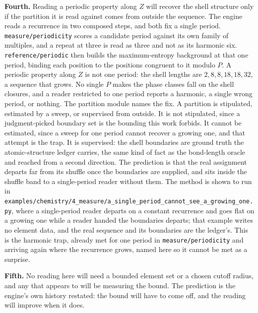 \textbf{Fourth.} Reading a periodic property along \(Z\) will recover the shell structure only if the
partition it is read against comes from outside the sequence. The engine reads a recurrence in two
composed steps, and both fix a single period. \texttt{measure/periodicity} scores a candidate period
against its own family of multiples, and a repeat at three is read as three and not as its harmonic
six. \texttt{reference/periodic} then builds the maximum-entropy background at that one period, binding
each position to the positions congruent to it modulo \(P\). A periodic property along \(Z\) is not one
period: the shell lengths are \(2, 8, 8, 18, 18, 32\), a sequence that grows. No single \(P\) makes the
phase classes fall on the shell closures, and a reader restricted to one period reports a harmonic, a
single wrong period, or nothing. The partition module names the fix. A partition is stipulated,
estimated by a sweep, or supervised from outside. It is not stipulated, since a judgment-picked
boundary set is the bounding this work forbids. It cannot be estimated, since a sweep for one period
cannot recover a growing one, and that attempt is the trap. It is supervised: the shell boundaries are
ground truth the atomic-structure ledger carries, the same kind of fact as the bond-length oracle and
reached from a second direction. The prediction is that the real assignment departs far from its
shuffle once the boundaries are supplied, and sits inside the shuffle band to a single-period reader
without them. The method is shown to run in
\texttt{examples/chemistry/4\_measure/a\_single\_period\_cannot\_see\_a\_growing\_one.py}, where a
single-period reader departs on a constant recurrence and goes flat on a growing one while a reader
handed the boundaries departs; that example writes no element data, and the real sequence and its
boundaries are the ledger's. This is the harmonic trap, already met for one period in
\texttt{measure/periodicity} and arriving again where the recurrence grows, named here so it cannot be
met as a surprise.

\textbf{Fifth.} No reading here will need a bounded element set or a chosen cutoff radius, and any
that appears to will be measuring the bound. The prediction is the engine's own history restated:
the bound will have to come off, and the reading will improve when it does.
